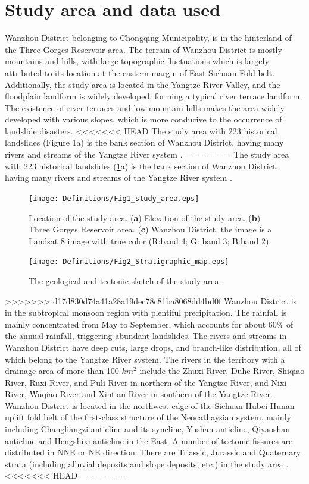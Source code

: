 \documentclass[a4paper,fleqn]{cas-sc}
\begin{document}
\section{Study area and data used}

Wanzhou District belonging to Chongqing Municipality, is in the hinterland of the Three Gorges Reservoir area. 
The terrain of Wanzhou District is mostly mountains and hills, with large topographic fluctuations which is largely attributed to its location at the eastern margin of East Sichuan Fold belt. 
Additionally, the study area is located in the Yangtze River Valley, and the floodplain landform is widely developed, forming a typical river terrace landform. The existence of river terraces and low mountain hills makes the area widely developed with various slopes, which is more conducive to the occurrence of landslide disasters.
<<<<<<< HEAD
The study area with 223 historical landslides (Figure 1a) is the bank section of Wanzhou District, having many rivers and streams of the Yangtze River system \citep{Yu2016IJERPH,Song2018}. 
=======
The study area with 223 historical landslides (\ref{StudyArea}a) is the bank section of Wanzhou District, having many rivers and streams of the Yangtze River system \citep{Yu2016IJERPH,Song2018}. 

\begin{figure}
  \centering
  \texttt{[image: Definitions/Fig1\_study\_area.eps]}
  \caption{Location of the study area. (\textbf{a}) Elevation of the study area. (\textbf{b}) Three Gorges Reservoir area. (\textbf{c}) Wanzhou District, the image is a Landsat 8 image with true color (R:band 4; G: band 3; B:band 2).}
  \label{StudyArea}
\end{figure}  
  
\begin{figure}
  \centering
  \texttt{[image: Definitions/Fig2\_Stratigraphic\_map.eps]}
  \caption{The geological and tectonic sketch of the study area.}
  \label{Fig_Lithology}
\end{figure} 

>>>>>>> d17d830d74a41a28a19dec78c81ba8068dd4bd0f
Wanzhou District is in the subtropical monsoon region with plentiful precipitation. 
The rainfall is mainly concentrated from May to September, which accounts for about 60\% of the annual rainfall, triggering abundant landslides. 
The rivers and streams in Wanzhou District have deep cuts, large drops, and branch-like distribution, all of which belong to the Yangtze River system. 
The rivers in the territory with a drainage area of more than 100 $km^{2}$ include the Zhuxi River, Duhe River, Shiqiao River, Ruxi River, and Puli River in northern of the Yangtze River, and Nixi River, Wuqiao River and Xintian River in southern of the Yangtze River. 
Wanzhou District is located in the northwest edge of the Sichuan-Hubei-Hunan uplift fold belt of the first-class structure of the Neocathaysian system, mainly including Changliangzi anticline and its syncline, Yushan anticline, Qiyaoshan anticline and Hengshixi anticline in the East. 
A number of tectonic fissures are distributed in NNE or NE direction. There are Triassic, Jurassic and Quaternary strata (including alluvial deposits and slope deposits, etc.) in the study area \citep{Song2018}. 
<<<<<<< HEAD
=======
\end{document}
